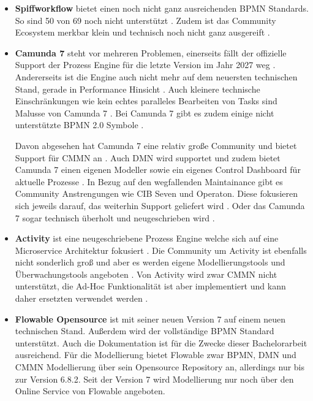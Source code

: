 \begin{itemize}
    \item \textbf{Spiffworkflow} bietet einen noch nicht ganz ausreichenden BPMN Standards. So sind 50 von 69 noch nicht unterstützt \citep[vgl.][]{funk_creating_2023}. Zudem ist das Community Ecosystem merkbar klein und technisch noch nicht ganz ausgereift \citep[vgl.][]{spiffworkflow_overview_2024}.

    \item \textbf{Camunda 7} steht vor mehreren Problemen, einerseits fällt der offizielle Support der Prozess Engine für die letzte Version im Jahr 2027 weg \citep[vgl.][]{camunda_services_gmbh_support_2024}. Andererseits ist die Engine auch nicht mehr auf dem neuersten technischen Stand, gerade in Performance Hinsicht \citep[vgl.][]{johnson_why_2023}. Auch kleinere technische Einschränkungen wie kein echtes paralleles Bearbeiten von Tasks sind Malusse von Camunda 7 \citep[vgl.][]{camunda_services_gmbh_camunda_2023}. Bei Camunda 7 gibt es zudem einige nicht unterstützte \ac{BPMN} 2.0 Symbole \citep[vgl.][]{camunda_services_gmbh_bpmn_2024}. 
    
    Davon abgesehen hat Camunda 7 eine relativ große Community und bietet Support für \ac{CMMN} an \citep[vgl.][]{camunda_services_gmbh_cmmn_2024}. Auch \ac{DMN} wird supportet und zudem bietet Camunda 7 einen eigenen Modeller sowie ein eigenes Control Dashboard für aktuelle Prozesse \citep[vgl.][]{camunda_services_gmbh_dmn_2024}. In Bezug auf den wegfallenden Maintainance gibt es Community Anstrengungen wie CIB Seven und Operaton. Diese fokusieren sich jeweils darauf, das weiterhin Support geliefert wird \citep[vgl.][]{cib_open_2024}. Oder das Camunda 7 sogar technisch überholt und neugeschrieben wird \citep[vgl.][]{zoller_operaton_2024}.
    
    \item \textbf{Activity} ist eine neugeschriebene Prozess Engine welche sich auf eine Microservice Architektur fokusiert \citep[vgl.][]{activity_open_2024}. Die Community um Activity ist ebenfalls nicht sonderlich groß und aber es werden eigene Modellierungstools und Überwachungstools angeboten \citep[vgl.][]{activity_activiti_2024}. Von Activity wird zwar \ac{CMMN} nicht unterstützt, die Ad-Hoc Funktionalität ist aber implementiert und kann daher ersetzten verwendet werden \citep[vgl.][]{hyland_activiti_2017}. 

    \item \textbf{Flowable Opensource} ist mit seiner neuen Version 7 auf einem neuen technischen Stand. Außerdem wird der vollständige \ac{BPMN} Standard unterstützt. Auch die Dokumentation ist für die Zwecke dieser Bachelorarbeit ausreichend. Für die Modellierung bietet Flowable zwar \ac{BPMN}, \ac{DMN} und \ac{CMMN} Modellierung über sein Opensource Repository an, allerdings nur bis zur Version 6.8.2. Seit der Version 7 wird Modellierung nur noch über den Online Service von Flowable angeboten. \citep[vgl.][]{flowable_flowable_2024} 
    

\end{itemize}
